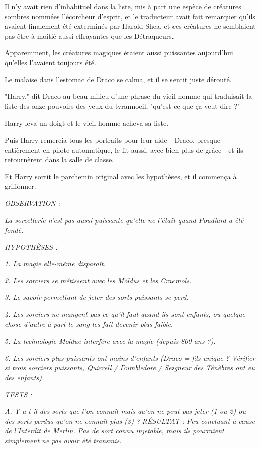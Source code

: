 Il n'y avait rien d'inhabituel dans la liste, mis à part une espèce de créatures sombres nommées l'écorcheur d'esprit, et le traducteur avait fait remarquer qu'ils avaient finalement été exterminés par Harold Shea, et ces créatures ne semblaient pas être à moitié aussi effrayantes que les Détraqueurs.

Apparemment, les créatures magiques étaient aussi puissantes aujourd'hui qu'elles l'avaient toujours été.

Le malaise dans l'estomac de Draco se calma, et il se sentit juste dérouté.

"Harry," dit Draco au beau milieu d'une phrase du vieil homme qui traduisait la liste des onze pouvoirs des yeux du tyrannoeil, "qu'est-ce que ça veut dire ?"

Harry leva un doigt et le vieil homme acheva sa liste.

Puis Harry remercia tous les portraits pour leur aide - Draco, presque entièrement en pilote automatique, le fit aussi, avec bien plus de grâce - et ils retournèrent dans la salle de classe.

Et Harry sortit le parchemin original avec les hypothèses, et il commença à griffonner.

\emph{\MakeUppercase{Observation :}} 

\emph{La sorcellerie n'est pas aussi puissante qu'elle ne l'était quand Poudlard a été fondé.} 

\emph{\MakeUppercase{Hypothèses :}} 

\emph{1. La magie elle-même disparaît.} 

\emph{2. Les sorciers se métissent avec les Moldus et les Cracmols.} 

\emph{3. Le savoir permettant de jeter des sorts puissants se perd.} 

\emph{4. Les sorciers ne mangent pas ce qu'il faut quand ils sont enfants, ou quelque chose d'autre à part le sang les fait devenir plus faible.} 

\emph{5. La technologie Moldue interfère avec la magie (depuis 800 ans ?).} 

\emph{6. Les sorciers plus puissants ont moins d'enfants (Draco = fils unique ? Vérifier si trois sorciers puissants, Quirrell / Dumbledore / Seigneur des Ténèbres ont eu des enfants).} 

\emph{\MakeUppercase{Tests :}} 

\emph{A. Y a-t-il des sorts que l'on connaît mais qu'on ne peut pas jeter (1 ou 2) ou des sorts perdus qu'on ne connaît plus (3) ? } \emph{\MakeUppercase{Résultat :}}  \emph{Peu concluant à cause de l'Interdit de Merlin. Pas de sort connu injetable, mais ils pourraient simplement ne pas avoir été transmis.} 

